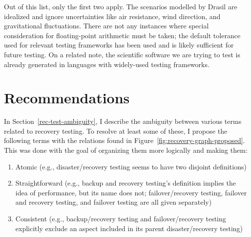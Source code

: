 Out of this list, only the first two apply. The scenarios modelled by Drasil
are idealized and ignore uncertainties like air resistance, wind direction,
and gravitational fluctuations. There are not any instances where special
consideration for floating-point arithmetic must be taken; the default
tolerance used for relevant testing frameworks has been used
 and is likely sufficient for future testing. On a related
note, the scientific software we are trying to test is already generated in
languages with widely-used testing frameworks. 

\section{Recommendations}

In Section~\ref{rec-test-ambiguity}, I describe the ambiguity between various
terms related to recovery testing. To resolve at least some of these, I propose
the following terms with the relations found in
Figure~\ref{fig:recovery-graph-proposed}. This was done with the goal of
organizing them more logically and making them:
\begin{enumerate}
      \item Atomic (e.g., disaster/recovery testing seems to have two
            disjoint definitions)
      \item Straightforward (e.g., backup and recovery testing's definition
            implies the idea of performance, but its name does not;
            failover/recovery testing, failover and recovery testing,
            and failover testing are all given separately)
      \item Consistent (e.g., backup/recovery testing and failover/recovery
            testing explicitly exclude an aspect included in its parent
            disaster/recovery testing)
\end{enumerate}

